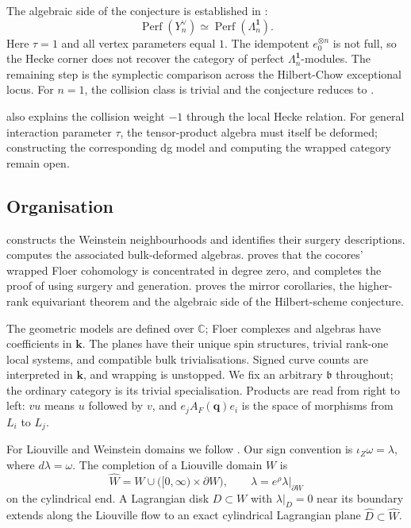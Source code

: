 \documentclass[a4paper]{amsart}
\newcommand{\kk}{\mathbf{k}}
\newcommand{\C}{\mathbb{C}}
\DeclareMathOperator{\Perf}{Perf}
\numberwithin{equation}{section}
\begin{document}
The algebraic side of the conjecture is established in
:
\[
 \Perf(Y_n^\vee)\simeq\Perf(\Lambda_n^{\boldsymbol1}).
\]
Here $\tau=1$ and all vertex parameters equal $1$. The idempotent
$e_0^{\otimes n}$ is not full, so the Hecke corner does not recover
the category of perfect $\Lambda_n^{\boldsymbol1}$-modules. The remaining
step is the symplectic comparison across the Hilbert-Chow
exceptional locus. For $n=1$, the collision class is trivial and
the conjecture reduces to .

 also explains the collision weight $-1$
through the local Hecke relation. For general interaction parameter
$\tau$, the tensor-product algebra must itself be deformed;
constructing the corresponding dg model and computing the wrapped
category remain open.

\subsection{Organisation}

 constructs the Weinstein neighbourhoods
and identifies their surgery descriptions. 
computes the associated bulk-deformed algebras.
 proves that the cocores' wrapped Floer
cohomology is concentrated in degree zero, and 
completes the proof of  using surgery and generation.
 proves the mirror corollaries, the
higher-rank equivariant theorem and the algebraic side of the
Hilbert-scheme conjecture.

\begin{conventions}
The geometric models are defined over $\C$; Floer complexes and algebras
have coefficients in $\kk$. The planes have their unique spin structures,
trivial rank-one local systems, and compatible bulk trivialisations.
Signed curve counts are interpreted in $\kk$, and wrapping is unstopped.
We fix an arbitrary $\mathfrak{b}$ throughout; the ordinary category is
its trivial specialisation. Products are read from right to left:
$vu$ means $u$ followed by $v$, and $e_jA_F(\boldsymbol q)e_i$ is the
space of morphisms from $L_i$ to $L_j$.

For Liouville and Weinstein domains we follow \cite{CE}. Our sign
convention is $\iota_Z\omega=\lambda$, where $d\lambda=\omega$.
The completion of a Liouville domain $W$ is
\[
 \widehat W=W\cup\bigl([0,\infty)\times\partial W\bigr),
 \qquad \lambda=e^\rho\lambda|_{\partial W}
\]
on the cylindrical end. A Lagrangian disk $D\subset W$ with
$\lambda|_D=0$ near its boundary extends along the Liouville flow
to an exact cylindrical Lagrangian plane $\widehat D\subset\widehat W$.
\end{conventions}
\end{document}
